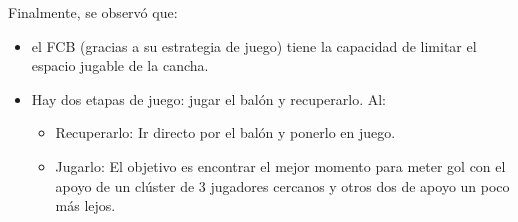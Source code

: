 \documentclass[a4paper, 12pt]{report}
\begin{document}
Finalmente, se observó que:
\begin{itemize}
\item{el FCB (gracias a su estrategia de juego) tiene la capacidad de limitar el
    espacio jugable de la cancha.}
\item{Hay dos etapas de juego: jugar el balón y recuperarlo. Al:
    \begin{itemize}
    \item{Recuperarlo: Ir directo por el balón y ponerlo en juego.}
    \item{Jugarlo: El objetivo es encontrar el mejor momento para meter gol con
        el apoyo de un clúster de 3 jugadores cercanos y otros dos de apoyo un
        poco más lejos.
    }
    \end{itemize}
}
\end{itemize}
\end{document}
